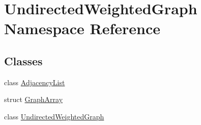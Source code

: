 \hypertarget{namespace_undirected_weighted_graph}{\section{Undirected\+Weighted\+Graph Namespace Reference}
\label{namespace_undirected_weighted_graph}
}
\subsection*{Classes}
\begin{DoxyCompactItemize}
\item 
class \hyperlink{class_undirected_weighted_graph_1_1_adjacency_list}{Adjacency\+List}
\item 
struct \hyperlink{struct_undirected_weighted_graph_1_1_graph_array}{Graph\+Array}
\item 
class \hyperlink{class_undirected_weighted_graph_1_1_undirected_weighted_graph}{Undirected\+Weighted\+Graph}
\end{DoxyCompactItemize}
